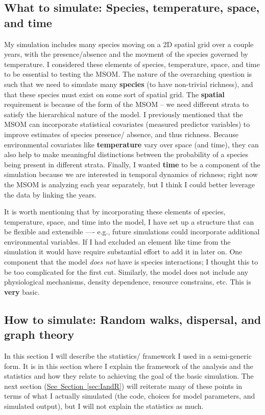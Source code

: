 \documentclass{article}\usepackage[]{graphicx}\usepackage[]{color}
\begin{document}
\subsection{What to simulate: Species, temperature, space, and time}
\par
My simulation includes many species moving on a 2D spatial grid over a couple years, with the presence/absence and the movment of the species governed by temperature. I considered these elements of species, temperature, space, and time to be essential to testing the MSOM. The nature of the overarching question is such that we need to simulate many \textbf{species} (to have non-trivial richness), and that these species must exist on some sort of spatial grid. The \textbf{spatial} requirement is because of the form of the MSOM -- we need different strata to satisfy the hierarchical nature of the model. I previously mentioned that the MSOM can incorporate statistical covariates (measured predictor variables) to improve estimates of species presence/ absence, and thus richness. Because environmental covariates like \textbf{temperature} vary over space (and time), they can also help to make meaningful distinctions between the probability of a species being present in different strata. Finally, I wanted \textbf{time} to be a component of the simulation because we are interested in temporal dynamics of richness; right now the MSOM is analyzing each year separately, but I think I could better leverage the data by linking the years.

\par
It is worth mentioning that by incorporating these elements of species, temperature, space, and time into the model, I have set up a structure that can be flexible and extensible ---- e.g., future simulations could incorporate additional environmental variables. If I had excluded an element like time from the simulation it would have require substantial effort to add it in later on. One component that the model \emph{does not} have is species interactions; I thought this to be too complicated for the first cut. Similarly, the model does not include any physiological mechanisms, density dependence, resource constrains, etc. This is \textbf{very} basic.

\subsection{How to simulate: Random walks, dispersal, and graph theory}
In this section I will describe the statistics/ framework I used in a semi-generic form. It is in this section where I explain the framework of the analysis and the statistics and how they relate to achieving the goal of the basic simulation. The next section (\hyperref[sec:IandR]{See~Section~\ref{sec:IandR}}) will reiterate many of these points in terms of what I actually simulated (the code, choices for model parameters, and simulated output), but I will not explain the statistics as much.
\end{document}
